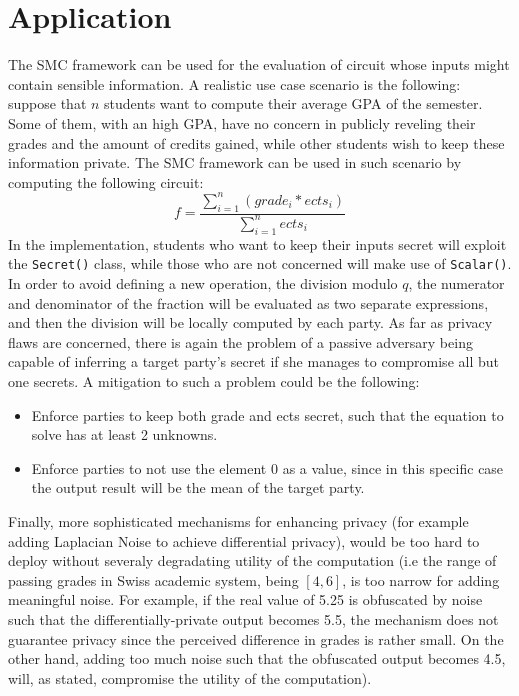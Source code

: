 \documentclass[10pt,conference,compsocconf]{IEEEtran}
\begin{document}
\section{Application}
The SMC framework can be used for the evaluation of circuit whose inputs might contain sensible information.
A realistic use case scenario is the following: suppose that $n$ students want to compute their average GPA of the semester.
Some of them, with an high GPA, have no concern in publicly reveling their grades and the amount of credits gained, while other students wish to keep these information private.
The SMC framework can be used in such scenario by computing the following circuit:
\[f = \frac{\sum_{i=1}^{n}(grade_{i}*ects_{i})}{\sum_{i=1}^{n}ects_{i}}\]
In the implementation, students who want to keep their inputs secret will exploit the \texttt{Secret()} class, while those who are not concerned will make use of \texttt{Scalar()}.
In order to avoid defining a new operation, the division modulo $q$, the numerator and denominator of the fraction will be evaluated as two separate expressions, and then the division will be locally computed by each party.
As far as privacy flaws are concerned, there is again the problem of a passive adversary being capable of inferring a target party's secret if she manages to compromise all but one secrets.
A mitigation to such a problem could be the following:
\begin{itemize}
   \item Enforce parties to keep both grade and ects secret, such that the equation to solve has at least 2 unknowns.
   \item Enforce parties to not use the element $0$ as a value, since in this specific case the output result will be the mean of the target party.
\end{itemize}
Finally, more sophisticated mechanisms for enhancing privacy (for example adding Laplacian Noise to achieve differential privacy), would be too hard to deploy without severaly degradating utility of the computation (i.e the range of passing grades in Swiss academic system, being $[4,6]$, is too narrow for adding meaningful noise. For example, if the real value of 5.25 is obfuscated by noise such that the differentially-private output becomes 5.5, the mechanism does not guarantee privacy since the perceived difference in grades is rather small. On the other hand, adding too much noise such that the obfuscated output becomes 4.5, will, as stated, compromise the utility of the computation).


\end{document}
